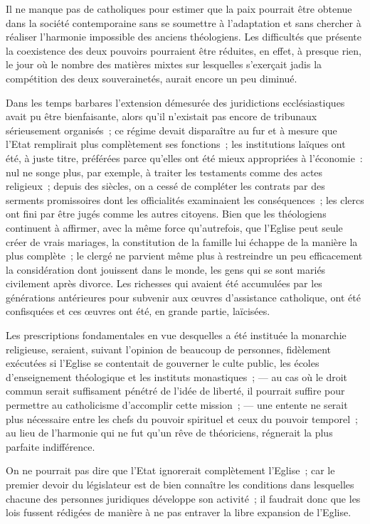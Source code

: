 \documentclass[french,twoside]{book} %
\begin{document}
\noindent Il ne manque pas de catholiques pour estimer que la paix pourrait être obtenue dans la société contemporaine sans se soumettre à l’adaptation et sans chercher à réaliser l’harmonie impossible des anciens théologiens. Les difficultés que présente la coexistence des deux pouvoirs pourraient être réduites, en effet, à presque rien, le  jour où le nombre des matières mixtes sur lesquelles s’exerçait jadis la compétition des deux souverainetés, aurait encore un peu diminué.\par
Dans les temps barbares l’extension démesurée des juridictions ecclésiastiques avait pu être bienfaisante, alors qu’il n’existait pas encore de tribunaux sérieusement organisés ; ce régime devait disparaître au fur et à mesure que l’Etat remplirait plus complètement ses fonctions ; les institutions laïques ont été, à juste titre, préférées parce qu’elles ont été mieux appropriées à l’économie : nul ne songe plus, par exemple, à traiter les testaments comme des actes religieux ; depuis des siècles, on a cessé de compléter les contrats par des serments promissoires dont les officialités examinaient les conséquences ; les clercs ont fini par être jugés comme les autres citoyens. Bien que les théologiens continuent à affirmer, avec la même force qu’autrefois, que l’Eglise peut seule créer de vrais mariages, la constitution de la famille lui échappe de la manière la plus complète ; le clergé ne parvient même plus à restreindre un peu efficacement la considération dont jouissent dans le monde, les gens qui se sont mariés civilement après divorce. Les richesses qui avaient été accumulées par les générations antérieures pour subvenir aux œuvres d’assistance catholique, ont été confisquées et ces œuvres ont été, en grande partie, laïcisées.\par
Les prescriptions fondamentales en vue desquelles a été instituée la monarchie religieuse, seraient, suivant l’opinion de beaucoup de personnes, fidèlement exécutées si l’Eglise se contentait de gouverner le culte public, les écoles d’enseignement théologique et les instituts monastiques ; — au cas où le droit commun serait suffisament  pénétré de l’idée de liberté, il pourrait suffire pour permettre au catholicisme d’accomplir cette mission ; — une entente ne serait plus nécessaire entre les chefs du pouvoir spirituel et ceux du pouvoir temporel ; au lieu de l’harmonie qui ne fut qu’un rêve de théoriciens, régnerait la plus parfaite indifférence.\par
On ne pourrait pas dire que l’Etat ignorerait complètement l’Eglise ; car le premier devoir du législateur est de bien connaître les conditions dans lesquelles chacune des personnes juridiques développe son activité ; il faudrait donc que les lois fussent rédigées de manière à ne pas entraver la libre expansion de l’Eglise.\par
\end{document}
